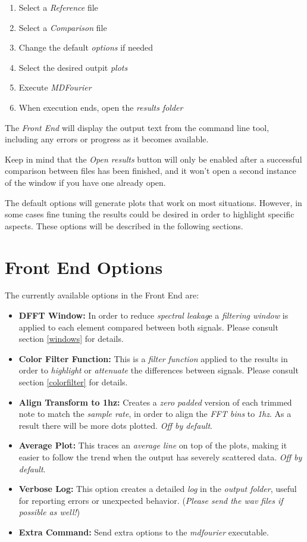 \documentclass[10pt,a4paper]{report}
\begin{document}
\begin{enumerate}
	\item Select a \textit{Reference} file
	\item Select a \textit{Comparison} file
	\item Change the default \textit{options} if needed
	\item Select the desired outpit \textit{plots}
	\item Execute \textit{MDFourier}
	\item When execution ends, open the \textit{results folder}
\end{enumerate}

The \textit{Front End} will display the output text from the command line tool, including any errors or progress as it becomes available.

Keep in mind that the \textit{Open results} button will only be enabled after a successful comparison between files has been finished, and it won't open a second instance of the window if you have one already open.

The default options will generate plots that work on most situations. However, in some cases fine tuning the results could be desired in order to highlight specific aspects. These options will be described in the following sections.

\section{Front End Options}

The currently available options in the Front End are:

\begin{itemize}
	\item \textbf{DFFT Window:} In order to reduce \textit{spectral leakag}e a \textit{filtering window} is applied to each element compared between both signals. Please consult section \ref{windows} for details. 
	\item \textbf{Color Filter Function:} This is a \textit{filter function} applied to the results in order to \textit{highlight} or \textit{attenuate} the differences between signals. Please consult section \ref{colorfilter} for details. 
	\item \textbf{Align Transform to 1hz:} Creates a \textit{zero padded} version of each trimmed note to match the \textit{sample rate}, in order to align the \textit{FFT bins} to \textit{1hz}. As a  result there will be more dots plotted. \textit{Off by default}.
	\item \textbf{Average Plot:} This traces an \textit{average line} on top of the plots, making it easier to follow the trend when the output has severely scattered data. \textit{Off by default}.
	\item \textbf{Verbose Log:} This option creates a detailed \textit{log} in the \textit{output folder}, useful for reporting errors or unexpected behavior. (\textit{Please send the wav files if possible as well!})
	\item \textbf{Extra Command:} Send extra options to the \textit{mdfourier} executable.
\end{itemize}
\end{document}
